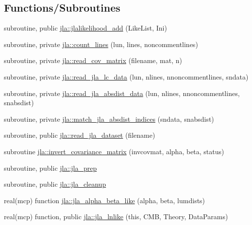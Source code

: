 \subsection*{Functions/\+Subroutines}
\begin{DoxyCompactItemize}
\item 
subroutine, public \mbox{\hyperlink{namespacejla_a76279ec95aebe74a01796fb5d2734d94}{jla\+::jlalikelihood\+\_\+add}} (Like\+List, Ini)
\item 
subroutine, private \mbox{\hyperlink{namespacejla_a2b7997e55b705956940cd1729f2a6e93}{jla\+::count\+\_\+lines}} (lun, lines, noncommentlines)
\item 
subroutine, private \mbox{\hyperlink{namespacejla_ae2ea921f1a8597682a71a793dc11bbe7}{jla\+::read\+\_\+cov\+\_\+matrix}} (filename, mat, n)
\item 
subroutine, private \mbox{\hyperlink{namespacejla_aadb5af8cc4301188cd29adc8b94a5bb0}{jla\+::read\+\_\+jla\+\_\+lc\+\_\+data}} (lun, nlines, nnoncommentlines, sndata)
\item 
subroutine, private \mbox{\hyperlink{namespacejla_ad1ad5e96f9f9f225249edadd8b348012}{jla\+::read\+\_\+jla\+\_\+absdist\+\_\+data}} (lun, nlines, nnoncommentlines, snabsdist)
\item 
subroutine, private \mbox{\hyperlink{namespacejla_af2e3afa13e8cf5731d6cf06c1ddaf31a}{jla\+::match\+\_\+jla\+\_\+absdist\+\_\+indices}} (sndata, snabsdist)
\item 
subroutine, public \mbox{\hyperlink{namespacejla_a3a08d66a30f511b1a63b006b9c1fac53}{jla\+::read\+\_\+jla\+\_\+dataset}} (filename)
\item 
subroutine \mbox{\hyperlink{namespacejla_a212c8dceda3061fd0e44c6a2834a4196}{jla\+::invert\+\_\+covariance\+\_\+matrix}} (invcovmat, alpha, beta, status)
\item 
subroutine, public \mbox{\hyperlink{namespacejla_a840bbaee909bef635242328944cb1a14}{jla\+::jla\+\_\+prep}}
\item 
subroutine, public \mbox{\hyperlink{namespacejla_abe626bf6278990fc57f73440426b3740}{jla\+::jla\+\_\+cleanup}}
\item 
real(mcp) function \mbox{\hyperlink{namespacejla_aaf4f263910da5f17d55cd63613847567}{jla\+::jla\+\_\+alpha\+\_\+beta\+\_\+like}} (alpha, beta, lumdists)
\item 
real(mcp) function, public \mbox{\hyperlink{namespacejla_a9a536b5f47c5314d3099af7ca66ec027}{jla\+::jla\+\_\+lnlike}} (this, C\+MB, Theory, Data\+Params)
\end{DoxyCompactItemize}
